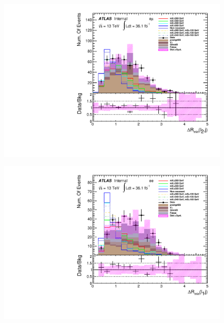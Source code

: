 \begin{figure}[h]
\begin{minipage}[t]{0.33\linewidth}
 \includegraphics[width=1.0\textwidth]{fig/dataMC_high_Njet_CR/mindR_l2j_emu.pdf}\label{fig:dataMC_high_Njet_CR:mindRl2j_emu.pdf}
 \end{minipage}
 \begin{minipage}[t]{0.33\linewidth}
 \centering
 \includegraphics[width=1.0\textwidth]{fig/dataMC_high_Njet_CR/mindR_l1j_ee.pdf}\label{fig:dataMC_high_Njet_CR:mindRl1j_ee.pdf}
 \end{minipage}
 \begin{minipage}[t]{0.33\linewidth}
 \centering

\end{minipage}
\end{figure}
